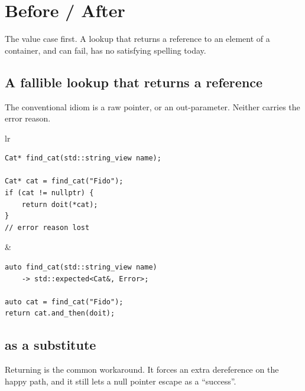 \documentclass[a4paper,10pt,oneside,openany,final,article]{memoir}
\begin{document}
\chapter{Before / After}

The value case first. A lookup that returns a reference to an element of a
container, and can fail, has no satisfying spelling today.

\section{A fallible lookup that returns a reference}

The conventional idiom is a raw pointer, or an out-parameter. Neither carries
the error reason.

\begin{tabular}{ lr }
  \begin{minipage}[t]{0.45\columnwidth}
    \begin{verbatim}
Cat* find_cat(std::string_view name);

Cat* cat = find_cat("Fido");
if (cat != nullptr) {
    return doit(*cat);
}
// error reason lost
    \end{verbatim}
  \end{minipage}
  &
    \begin{minipage}[t]{0.45\columnwidth}
      \begin{verbatim}
auto find_cat(std::string_view name)
    -> std::expected<Cat&, Error>;

auto cat = find_cat("Fido");
return cat.and_then(doit);
      \end{verbatim}
    \end{minipage}
\end{tabular}

\section{ as a substitute}

Returning  is the common workaround. It forces an
extra dereference on the happy path, and it still lets a null pointer escape
as a ``success''.
\end{document}
